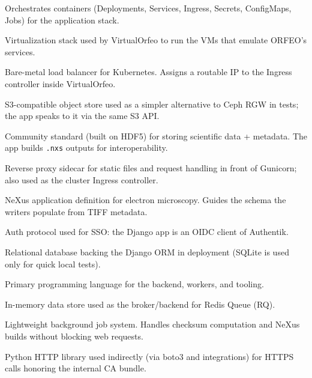 \begin{description}[style=nextline]
	\item[Kubernetes]
	Orchestrates containers (Deployments, Services, Ingress, Secrets, ConfigMaps, Jobs) for the application stack.
	
	\item[KVM/QEMU]
	Virtualization stack used by VirtualOrfeo to run the VMs that emulate ORFEO’s services.
	
	\item[MetalLB]
	Bare-metal load balancer for Kubernetes. Assigns a routable IP to the Ingress controller inside VirtualOrfeo.
	
	\item[MinIO]
	S3-compatible object store used as a simpler alternative to Ceph RGW in tests; the app speaks to it via the same S3 API.
	
	\item[NeXus]
	Community standard (built on HDF5) for storing scientific data + metadata. The app builds \texttt{.nxs} outputs for interoperability.
	
	\item[NGINX]
	Reverse proxy sidecar for static files and request handling in front of Gunicorn; also used as the cluster Ingress controller.
	
	\item[NXem]
	NeXus application definition for electron microscopy. Guides the schema the writers populate from TIFF metadata.
	
	\item[OpenID Connect (OIDC)]
	Auth protocol used for SSO: the Django app is an OIDC client of Authentik.
	
	\item[PostgreSQL]
	Relational database backing the Django ORM in deployment (SQLite is used only for quick local tests).
	
	\item[Python]
	Primary programming language for the backend, workers, and tooling.
	
	\item[Redis]
	In-memory data store used as the broker/backend for Redis Queue (RQ).
	
	\item[Redis Queue (RQ)]
	Lightweight background job system. Handles checksum computation and NeXus builds without blocking web requests.
	
	\item[Requests]
	Python HTTP library used indirectly (via boto3 and integrations) for HTTPS calls honoring the internal CA bundle.
	

\end{description}
